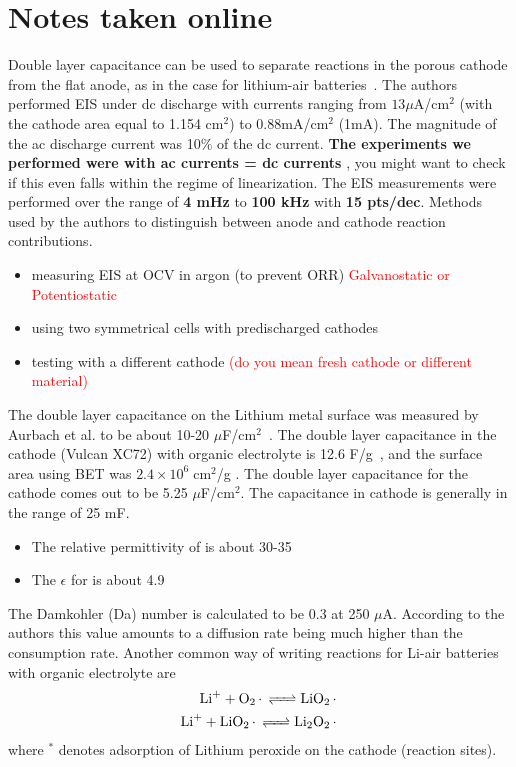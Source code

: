 \documentclass[12pt]{book}
\begin{document}
\chapter{Notes taken online}
Double layer capacitance can be used to separate reactions in the porous cathode from the flat anode, as in the case for lithium-air batteries~\cite{Hojberg2015}.
The authors performed EIS under dc discharge with currents ranging from $13 \mu$A/cm$^2$ (with the cathode area equal to 1.154 cm$^2$) to 0.88mA/cm$^2$ (1mA).  The magnitude of the ac discharge current was  10\% of the dc current. \textbf{The experiments we performed were with ac currents = dc currents}	, you might want to check if this even falls within the regime of linearization. The EIS measurements were performed over the range of \textbf{4 mHz} to \textbf{100 kHz} with \textbf{15 pts/dec}.  
Methods used by the authors to distinguish between anode and cathode reaction contributions. 
\begin{itemize}
\item measuring EIS at OCV in argon (to prevent ORR) \textcolor{red}{Galvanostatic or Potentiostatic}
\item using two symmetrical cells with predischarged cathodes
\item testing with a different cathode \textcolor{red}{(do you mean fresh cathode or different material)} 
\end{itemize}
The double layer capacitance on the Lithium metal surface was measured by Aurbach et al. to be about 10-20 $\mu$F/cm$^2$~\cite{Aurbach1994, Aurbach1995}. The double layer capacitance in the cathode (Vulcan XC72) with organic electrolyte is 12.6 F/g~\cite{Barbieri2005}, and the surface area using BET was $2.4\times 10^{6}\;\textrm{cm}^2$/g . The double layer capacitance for the cathode comes out to be 5.25  $\mu$F/cm$^2$.  The capacitance in cathode is generally in the range of 25 mF.
\begin{itemize}
\item The relative permittivity of  is about 30-35~\cite{Gerbig2013,Dunst2014}
\item The $\epsilon$ for  is about 4.9~\cite{Young1973}
\end{itemize}
The Damkohler (Da) number is calculated to be 0.3 at 250 $\mu$A. According to the authors this value amounts to a diffusion rate being much higher than the consumption rate.
Another common way of writing reactions for Li-air batteries with organic electrolyte are
\begin{align}
\ce{Li+ + O2* <=> LiO2*}\\
\ce{Li+ + LiO2* <=> Li2O2*}
\end{align}
where $^*$ denotes adsorption of Lithium peroxide on the cathode (reaction sites).
\end{document}
